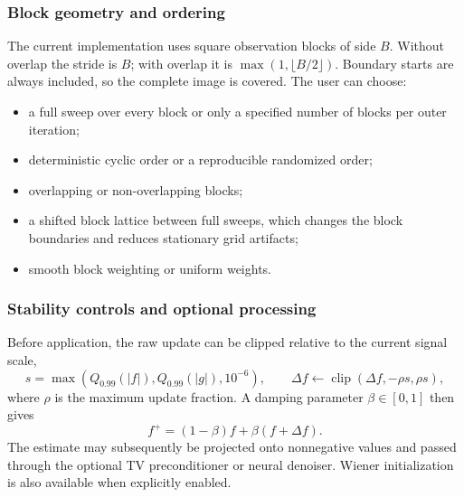 \documentclass[10pt,a4paper]{article}
\begin{document}
\subsubsection*{Block geometry and ordering}
The current implementation uses square observation blocks of side $B$. Without overlap the stride is $B$; with overlap it is $\max(1,\lfloor B/2\rfloor)$. Boundary starts are always included, so the complete image is covered. The user can choose:
\begin{itemize}
\item a full sweep over every block or only a specified number of blocks per outer iteration;
\item deterministic cyclic order or a reproducible randomized order;
\item overlapping or non-overlapping blocks;
\item a shifted block lattice between full sweeps, which changes the block boundaries and reduces stationary grid artifacts;
\item smooth block weighting or uniform weights.
\end{itemize}

\subsubsection*{Stability controls and optional processing}
Before application, the raw update can be clipped relative to the current signal scale,
\begin{equation}
s=\max\left(Q_{0.99}(|f|),Q_{0.99}(|g|),10^{-6}\right),\qquad
\Delta f\leftarrow\operatorname{clip}(\Delta f,-\rho s,\rho s),
\end{equation}
where $\rho$ is the maximum update fraction. A damping parameter $\beta\in[0,1]$ then gives
\begin{equation}
f^{+}=(1-\beta)f+\beta(f+\Delta f).
\end{equation}
The estimate may subsequently be projected onto nonnegative values and passed through the optional TV preconditioner or neural denoiser. Wiener initialization is also available when explicitly enabled.
\end{document}
